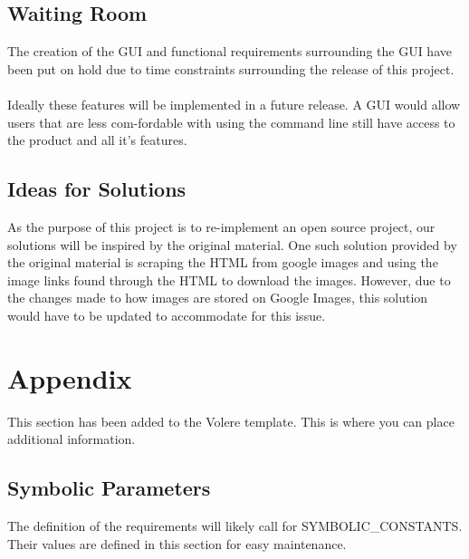\documentclass[12pt, titlepage]{article}
\begin{document}
\subsection{Waiting Room}

The creation of the GUI and functional requirements surrounding the GUI have been put on hold due to time constraints surrounding the release of this project.
\\ \\
Ideally these features will be implemented in a future release. A GUI would allow users that are less com-fordable with using the command line still have access to the product and all it's features.

\subsection{Ideas for Solutions}

As the purpose of this project is to re-implement an open source project, our solutions will be inspired by the original material. One such solution provided by the original material is scraping the HTML from google images and using the image links found through the HTML to download the images. However, due to the changes made to how images are stored on Google Images, this solution would have to be updated to accommodate for this issue.





\newpage

\section{Appendix}

This section has been added to the Volere template.  This is where you can place
additional information.

\subsection{Symbolic Parameters}

The definition of the requirements will likely call for SYMBOLIC\_CONSTANTS.
Their values are defined in this section for easy maintenance.
\end{document}
